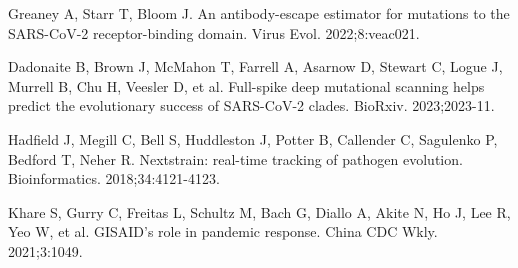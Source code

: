 \documentclass[10pt,letterpaper]{article}
\begin{document}
\begin{thebibliography}{10}
 Greaney A, Starr T, Bloom J. An antibody-escape estimator for mutations to the SARS-CoV-2 receptor-binding domain. Virus Evol. 2022;8:veac021.

 Dadonaite B, Brown J, McMahon T, Farrell A, Asarnow D, Stewart C, Logue J, Murrell B, Chu H, Veesler D, et al. Full-spike deep mutational scanning helps predict the evolutionary success of SARS-CoV-2 clades. BioRxiv. 2023;2023-11.

 Hadfield J, Megill C, Bell S, Huddleston J, Potter B, Callender C, Sagulenko P, Bedford T, Neher R. Nextstrain: real-time tracking of pathogen evolution. Bioinformatics. 2018;34:4121-4123.

 Khare S, Gurry C, Freitas L, Schultz M, Bach G, Diallo A, Akite N, Ho J, Lee R, Yeo W, et al. GISAID's role in pandemic response. China CDC Wkly. 2021;3:1049.

\end{thebibliography}
\end{document}
